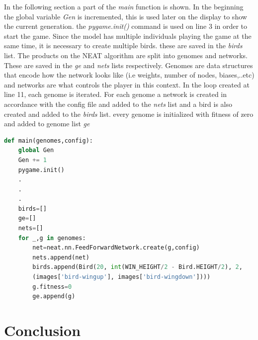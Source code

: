 \documentclass[conference]{IEEEtran}
\begin{document}
In the following section a part of the \textit{main} function is shown. In the beginning the global variable \textit{Gen} is incremented, this is used later on the display to show the current generation. the \textit{pygame.init()} command is used on line 3 in order to start the game. Since the model has multiple individuals playing the game at the same time, it is necessary to create multiple birds. these are saved in the \textit{birds} list. The products on the NEAT algorithm are split into genomes and networks. These are saved in the \textit{ge} and \textit{nets} lists respectively. Genomes are data structures that encode how the network looks like (i.e weights, number of nodes, biases,..etc) and networks are what controls the player in this context. In the loop created at line 11, each genome is iterated. For each genome a network is created in accordance with the config file and added to the \textit{nets} list and a bird is also created and added to the \textit{birds} list. every genome is initialized with fitness of zero and added to genome list \textit{ge}
\begin{lstlisting}[language=Python, caption=main function]
def main(genomes,config):
	global Gen
	Gen += 1
	pygame.init()
	.
	.
	.
	birds=[]
	ge=[]
	nets=[]
	for _,g in genomes:
		net=neat.nn.FeedForwardNetwork.create(g,config)
		nets.append(net)
		birds.append(Bird(20, int(WIN_HEIGHT/2 - Bird.HEIGHT/2), 2,
		(images['bird-wingup'], images['bird-wingdown'])))
		g.fitness=0
		ge.append(g)\end{lstlisting}

\section{Conclusion}
 

\end{document}
